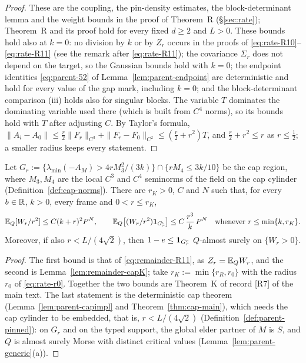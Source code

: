 \begin{proof}
These are the coupling, the pin-density estimates, the block-determinant lemma and the weight bounds in the proof of Theorem~R (\S\ref{sec:rate}); Theorem~R and its proof hold for every fixed $d\ge2$ and $L>0$. These bounds hold also at $k=0$: no division by $k$ or by $Z_r$ occurs in the proofs of \eqref{eq:rate-R10}--\eqref{eq:rate-R11} (see the remark after \eqref{eq:rate-R11}); the covariance $\Sigma_r$ does not depend on the target, so the Gaussian bounds hold with $k=0$; the endpoint identities \eqref{eq:parent-52} of Lemma~\ref{lem:parent-endpoint} are deterministic and hold for every value of the gap mark, including $k=0$; and the block-determinant comparison (iii) holds also for singular blocks. The variable $T$ dominates the dominating variable used there (which is built from $C^4$ norms), so its bounds hold with $T$ after adjusting $C$. By Taylor's formula, $\|A_i-A_0\|\le\frac r2\|F_r\|_{C^3}+\|F_r-F_0\|_{C^2}\le(\frac r2+r^2)T$, and $\frac r2+r^2\le r$ as $r\le\frac12$; a smaller radius keeps every statement.
\end{proof}

\begin{proposition}\label{prop:remainder-K}
Let $G_r:=\{\lambda_{\min}(-A_M)>4rM_3^2/(3k)\}\cap\{rM_4\le3k/10\}$ be the cap region, where $M_3,M_4$ are the local $C^3$ and $C^4$ seminorms of the field on the cap cylinder \cite[\S\S4,7]{parentP} (Definition~\ref{def:cap-norms}). There are $r_K>0$, $C$ and $N$ such that, for every $b\in\mathbb R$, $k>0$, every frame and $0<r\le r_K$,
\begin{equation}\label{eq:remainder-K}
\mathbb E_Q[W_r/r^2]\le C(k+r)^2P^N,\qquad \mathbb E_Q\bigl[(W_r/r^2)\mathbf 1_{G_r^c}\bigr]\le C\,\frac{r^3}k\,P^N\quad\text{whenever }r\le\min\{k,r_K\}.
\end{equation}
Moreover, if also $r<L/(4\sqrt2)$, then $1-e\le\mathbf 1_{G_r^c}$ $Q$-almost surely on $\{W_r>0\}$.
\end{proposition}

\begin{proof}
The first bound is that of \eqref{eq:remainder-R11}, as $Z_r=\mathbb E_QW_r$, and the second is Lemma~\ref{lem:remainder-capK}; take $r_K:=\min\{r_R,r_0\}$ with the radius $r_0$ of \eqref{eq:rate-r0}. Together the two bounds are Theorem~K of record [R7] of the main text. The last statement is the deterministic cap theorem \cite[\S\S7--8]{parentP} (Lemma~\ref{lem:parent-capimpl} and Theorem~\ref{thm:cap-main}), which needs the cap cylinder to be embedded, that is, $r<L/(4\sqrt2)$ (Definition~\ref{def:parent-pinned}): on $G_r$ and on the typed support, the global elder partner of $M$ is $S$, and $Q$ is almost surely Morse with distinct critical values \cite[\S8]{parentP} (Lemma~\ref{lem:parent-generic}(a)).
\end{proof}

